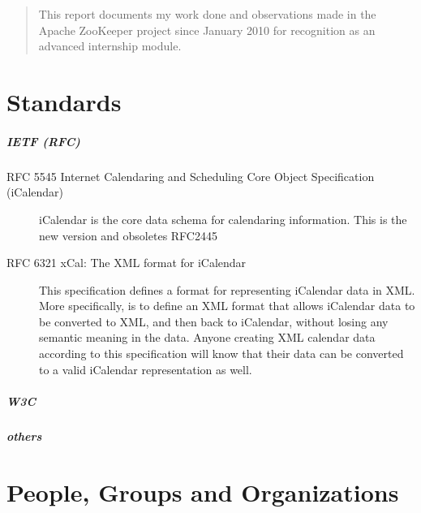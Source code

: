 \documentclass[12pt,a4paper]{scrartcl}		%
\begin{document}
\title{}
\subtitle{}
\author{Thomas Koch\\\url{thomas@koch.ro}\\matriculation number 7250371}
\publishers{Fernuniversität Hagen\\Faculty of mathematics and computer science}
\date{\today}
\maketitle{}

\tableofcontents{}
\begin{abstract}
  This report documents my work done and observations made in the Apache ZooKeeper project since January 2010 for recognition as an advanced internship module.
\end{abstract}
\newpage{}

\appendix

\section{Standards}

\subparagraph{IETF (RFC)}
\begin{description}

  \item[RFC 5545 Internet Calendaring and Scheduling Core Object Specification (iCalendar)]

    iCalendar is the core data schema for calendaring information. This is the
    new version and obsoletes RFC2445

  \item[RFC 6321 xCal: The XML format for iCalendar]

    This specification defines a format for representing iCalendar data in
    XML. More specifically, is to define an XML format that allows iCalendar
    data to be converted to XML, and then back to iCalendar, without losing any
    semantic meaning in the data. Anyone creating XML calendar data according to
    this specification will know that their data can be converted to a valid
    iCalendar representation as well.

\end{description}
\subparagraph{W3C}
\subparagraph{others}
\subparagraph{}

\section{People, Groups and Organizations}
\end{document}
